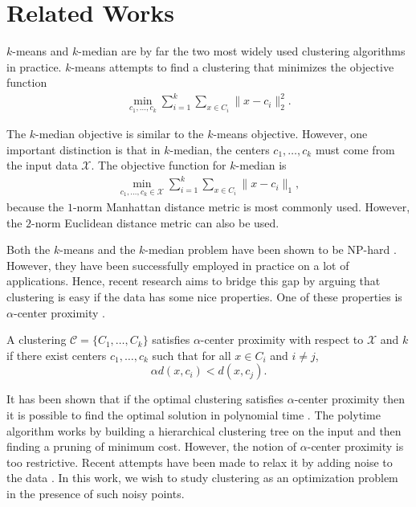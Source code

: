 \documentclass{article}
\newcommand{\mc}{\mathcal}
\begin{document}
\section{Related Works}
$k$-means and $k$-median are by far the two most widely used clustering algorithms in practice. $k$-means attempts to find a clustering that minimizes the objective function
\begin{align*}
	\min_{c_1, \ldots, c_k} \sum_{i=1}^k \sum_{x \in C_i} \|x-c_i\|_2^2 .
\end{align*}

The $k$-median objective is similar to the $k$-means objective. However, one important distinction is that in $k$-median, the centers $c_1, \ldots, c_k$ must come from the input data $\mc X$. The objective function for $k$-median is
\begin{align*}
	\min_{c_1, \ldots, c_k \in \mc X} \sum_{i=1}^k \sum_{x \in C_i} \|x-c_i\|_1 ,
\end{align*}
because the $1$-norm Manhattan distance metric is most commonly used. However, the $2$-norm Euclidean distance metric can also be used. 

Both the $k$-means and the $k$-median problem have been shown to be NP-hard \cite{kmeans}\cite{kmeans2}\cite{kmed}. However, they have been successfully employed in practice on a lot of applications. Hence, recent research aims to bridge this gap by arguing that clustering is easy if the data has some nice properties. One of these properties is $\alpha$-center proximity \cite{alphacenter}. 

A clustering $\mc C = \{C_1, \ldots, C_k\}$ satisfies $\alpha$-center proximity with respect to $\mc X$ and $k$ if there exist centers $c_1, \ldots, c_k$  such that for all $x \in C_i$ and $i\neq j$, $$\alpha d(x, c_i) < d(x, c_j).$$

It has been shown that if the optimal clustering satisfies $\alpha$-center proximity then it is possible to find the optimal solution in polynomial time \cite{Balcan}. The polytime algorithm works by building a hierarchical clustering tree on the input and then finding a pruning of minimum cost. However, the notion of $\alpha$-center proximity is too restrictive. Recent attempts have been made to relax it by adding noise to the data \cite{noise1}\cite{noise2}. In this work, we wish to study clustering as an optimization problem in the presence of such noisy points.  
\end{document}
